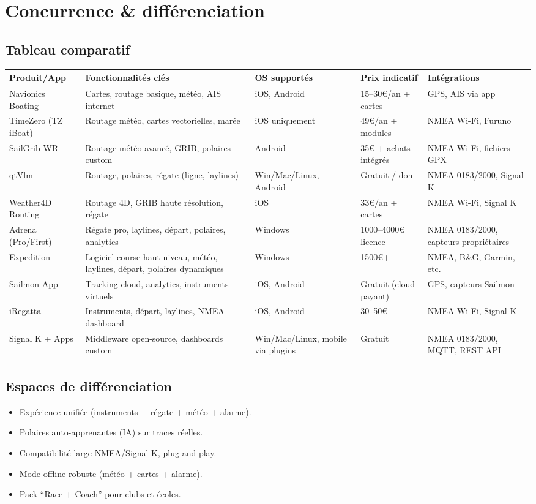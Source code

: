 \documentclass[12pt,a4paper]{article}
\begin{document}
\section{Concurrence \& différenciation}
\subsection{Tableau comparatif}
\renewcommand{\arraystretch}{1.3}
\begin{longtable}{|p{3cm}|p{4cm}|p{2.5cm}|p{2cm}|p{3cm}|}
\hline
\textbf{Produit/App} & \textbf{Fonctionnalités clés} & \textbf{OS supportés} & \textbf{Prix indicatif} & \textbf{Intégrations}\\
\hline
Navionics Boating & Cartes, routage basique, météo, AIS internet & iOS, Android & 15--30€/an + cartes & GPS, AIS via app \\
\hline
TimeZero (TZ iBoat) & Routage météo, cartes vectorielles, marée & iOS uniquement & 49€/an + modules & NMEA Wi-Fi, Furuno \\
\hline
SailGrib WR & Routage météo avancé, GRIB, polaires custom & Android & 35€ + achats intégrés & NMEA Wi-Fi, fichiers GPX \\
\hline
qtVlm & Routage, polaires, régate (ligne, laylines) & Win/Mac/Linux, Android & Gratuit / don & NMEA 0183/2000, Signal K \\
\hline
Weather4D Routing & Routage 4D, GRIB haute résolution, régate & iOS & 33€/an + cartes & NMEA Wi-Fi, Signal K \\
\hline
Adrena (Pro/First) & Régate pro, laylines, départ, polaires, analytics & Windows & 1000--4000€ licence & NMEA 0183/2000, capteurs propriétaires \\
\hline
Expedition & Logiciel course haut niveau, météo, laylines, départ, polaires dynamiques & Windows & 1500€+ & NMEA, B\&G, Garmin, etc. \\
\hline
Sailmon App & Tracking cloud, analytics, instruments virtuels & iOS, Android & Gratuit (cloud payant) & GPS, capteurs Sailmon \\
\hline
iRegatta & Instruments, départ, laylines, NMEA dashboard & iOS, Android & 30--50€ & NMEA Wi-Fi, Signal K \\
\hline
Signal K + Apps & Middleware open-source, dashboards custom & Win/Mac/Linux, mobile via plugins & Gratuit & NMEA 0183/2000, MQTT, REST API \\
\hline
\end{longtable}

\subsection{Espaces de différenciation}
\begin{itemize}
  \item Expérience unifiée (instruments + régate + météo + alarme).
  \item Polaires auto-apprenantes (IA) sur traces réelles.
  \item Compatibilité large NMEA/Signal K, plug-and-play.
  \item Mode offline robuste (météo + cartes + alarme).
  \item Pack ``Race + Coach'' pour clubs et écoles.
\end{itemize}
\end{document}
